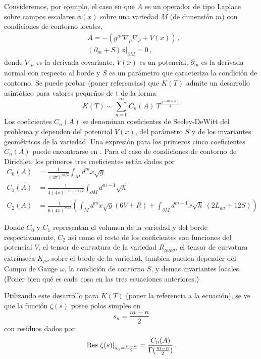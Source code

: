 Consideremos, por ejemplo, el caso en que $A$ es un operador de tipo Laplace sobre campos escalares $\phi(x)$ sobre una variedad $M$ (de dimensión $m$) con condiciones de contorno locales,
\begin{align}
&A = - \left(
			g ^{\mu \nu} \nabla _{\mu} \nabla _{\nu} + V(x)	\right) \,,\\[2mm]
&\left (\partial _m + S \right) \phi | _{\partial M} = 0\,,
\end{align}
donde $\nabla _{\mu}$ es la derivada covariante, $V(x)$ es un potencial, $\partial _m$ es la derivada normal con respecto al borde y $S$ es un parámetro que caracteriza la condición de contorno. Se puede probar {\red (poner referencias)} que $K(T)$ admite un desarrollo asintótico para valores pequeños de t  de la forma
\begin{equation}
K(T) \sim 
\sum _{n=0} ^{\infty}
C _n (A) \ 
T^{\frac{(-m+n)}{2}} 
\label{eq.heat.expansion}
\end{equation}
Los coeficientes $C_n(A)$ se denominan coeficientes de Seeley-DeWitt del problema y dependen del potencial $V(x)$, del parámetro $S$ y de los invariantes geométricos de la variedad. Una expresión para los primeros cinco coeficientes $C _n (A) $ puede encontrarse en \cite{VASSILEVICH2003279}. Para el caso de condiciones de contorno de Dirichlet, los primeros tres coeficientes están dados por
\begin{align}
C _0 (A) &= \frac{1}{(4 \pi ) ^{m/2} }  \int  _{M} d ^m x \sqrt{g}  \\[2mm]
C _1 (A) &= \frac{ 1 }{4 (4 \pi ) ^{(m-1)/2} } \int _{\partial M } d ^{m-1} \sqrt{h} \\[2mm]
C _2 (A) &= \frac{ 1 }{6 (4 \pi) ^{m/2} } \left(
									\int _M d ^m x\sqrt{g} (6 V + R) +
									\int _{\partial M } d ^{m-1} x 
									\sqrt{h} \ ( 2 L _{aa} + 12 S )
									\right)
\label{coef}
\end{align} 

{\magenta Donde $C _0$ y $C _1$ representan el volumen de la variedad y del borde respectivamente, $C _2$ así como el resto de los coeficientes son funciones del potencial $V$, el tensor de curvatura de la variedad $R _{\mu \nu \rho \sigma }$, el tensor de curvatura extrínseca $K _{\mu \nu }$ sobre el borde de la variedad, tambien pueden depender del Campo de Gauge $\omega $, la condición de contorno $S$, y demas invariantes locales.}{\red (Poner bien qué es cada cosa en las tres ecuaciones anteriores.)}

Utilizando este desarrollo para $K(T)$ {\red (poner la referencia a la ecuación)}, se ve que la función $\zeta (s)$ posee polos simples en
\begin{equation}
s _n = \frac{m-n}{2} 
\label{eq.ceros.zeta}
\end{equation}
con residuos dados por
\begin{equation}
\left. {\rm Res} \ \zeta  (s)  \right| _{s_n= \frac{m - n}{2}} =  
\frac{ C_n  (A) }{ {\Gamma ( \frac{m-n}{2}} ) }\,.
\label{losresi}
\end{equation}

